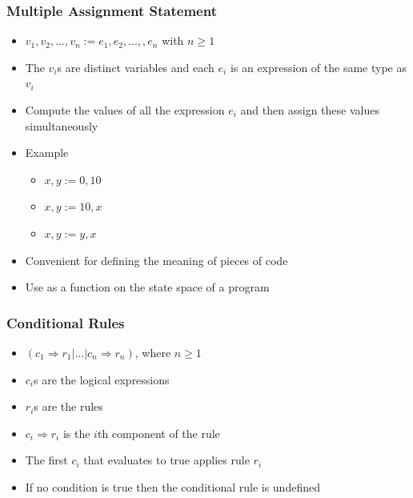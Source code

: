 \documentclass[t,12pt,numbers,fleqn]{beamer}
\begin{document}

\begin{frame}
\frametitle{Multiple Assignment Statement}
\begin{itemize}
\item $v_1, v_2, ..., v_n := e_1, e_2, ...,, e_n$ with $n \geq 1$
\item The $v_i$s are distinct variables and each $e_i$ is an expression of the same type as $v_i$
\item Compute the values of all the expression $e_i$ and then assign these values simultaneously
\item Example
\begin{itemize}
\item $x, y := 0, 10$
\item $x, y := 10, x$
\item $x, y := y, x$
\end{itemize}
\item Convenient for defining the meaning of pieces of code
\item Use as a function on the state space of a program
\end{itemize}
\end{frame}


\begin{frame}
\frametitle{Conditional Rules}
\begin{itemize}
\item $(c_1 \Rightarrow r_1 | ... | c_n \Rightarrow r_n )$, where $n \geq 1$
\item $c_i$s are the logical expressions
\item $r_i$s are the rules
\item $c_i \Rightarrow r_i$ is the $i$th component of the rule
\item The first $c_i$ that evaluates to true applies rule $r_i$
\item If no condition is true then the conditional rule is undefined
\end{itemize}
\end{frame}

\end{document}
